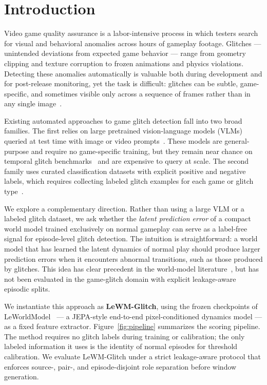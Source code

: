 \section{Introduction}
\label{sec:introduction}

Video game quality assurance is a labor-intensive process in which testers search for visual
and behavioral anomalies across hours of gameplay footage. Glitches --- unintended deviations
from expected game behavior --- range from geometry clipping and texture corruption to frozen
animations and physics violations. Detecting these anomalies automatically is valuable both
during development and for post-release monitoring, yet the task is difficult: glitches can be
subtle, game-specific, and sometimes visible only across a sequence of frames rather than in any
single image~\cite{tempglitch,worldofbugs}.

Existing automated approaches to game glitch detection fall into two broad families. The first
relies on large pretrained vision-language models (VLMs) queried at test time with image or
video prompts~\cite{glitchbench,tempglitch}. These models are general-purpose and require no
game-specific training, but they remain near chance on temporal glitch benchmarks~\cite{tempglitch}
and are expensive to query at scale. The second family uses curated classification datasets with
explicit positive and negative labels, which requires collecting labeled glitch examples for each
game or glitch type~\cite{worldofbugs}.

We explore a complementary direction. Rather than using a large VLM or a labeled glitch
dataset, we ask whether the \emph{latent prediction error} of a compact world model trained
exclusively on normal gameplay can serve as a label-free signal for episode-level glitch
detection. The intuition is straightforward: a world model that has learned the latent dynamics
of normal play should produce larger prediction errors when it encounters abnormal transitions,
such as those produced by glitches. This idea has clear precedent in the world-model
literature~\cite{worldmodels,dreamerv3}, but has not been evaluated in the game-glitch domain
with explicit leakage-aware episodic splits.

We instantiate this approach as \textbf{LeWM-Glitch}, using the frozen checkpoints of
LeWorldModel~\cite{lewm} --- a JEPA-style end-to-end pixel-conditioned dynamics model ---
as a fixed feature extractor. Figure~\ref{fig:pipeline} summarizes the scoring pipeline.
The method requires no glitch labels during training or calibration; the only labeled
information it uses is the identity of normal episodes for threshold calibration. We evaluate
LeWM-Glitch under a strict leakage-aware protocol that enforces source-, pair-, and
episode-disjoint role separation before window generation.

